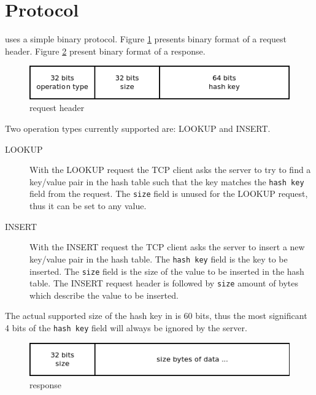 \section{Protocol}

\cpserver{} uses a simple binary protocol. Figure \ref{fig:protocolrequest} presents binary format of a request header.
Figure \ref{fig:protocolresponse} present binary format of a response.

\begin{figure}[!ht]
  \centering
  \includegraphics[width=0.8\linewidth]{figs/protocolrequest.png}
  \caption{\cpserver{} request header}
  \label{fig:protocolrequest}
\end{figure}

Two operation types currently supported are: LOOKUP and INSERT.
\begin{description}
\item[LOOKUP] With the LOOKUP request the TCP client asks the server to try to find a key/value pair in the hash table
such that the key matches the \texttt{hash key} field from the request. The \texttt{size} field is unused for the LOOKUP request,
thus it can be set to any value.
\item[INSERT] With the INSERT request the TCP client asks the server to insert a new key/value pair in the hash table. 
The \texttt{hash key} field is the key to be inserted. The \texttt{size} field is the size of the value to be inserted in the hash table.
The INSERT request header is followed by \texttt{size} amount of bytes which describe the value to be inserted.
\end{description}

The actual supported size of the hash key in \cphash{} is 60 bits, thus the most significant 
4 bits of the \texttt{hash key} field will always be ignored by the server.

\begin{figure}[!ht]
  \centering
  \includegraphics[width=0.8\linewidth]{figs/protocolresponse.png}
  \caption{\cpserver{} response}
  \label{fig:protocolresponse}
\end{figure}

